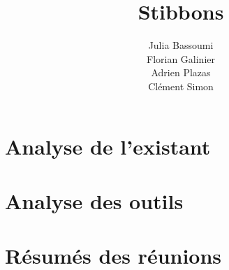 \documentclass[a4paper,11pt]{report}
\title{Stibbons}
\author{Julia Bassoumi\\Florian Galinier\\Adrien Plazas\\Clément Simon}
\begin{document}
\maketitle
\tableofcontents

\begin{abstract}
\end{abstract}

\chapter{Analyse de l'existant}




\chapter{Analyse des outils}







\appendix

\chapter{Résumés des réunions}




\end{document}
